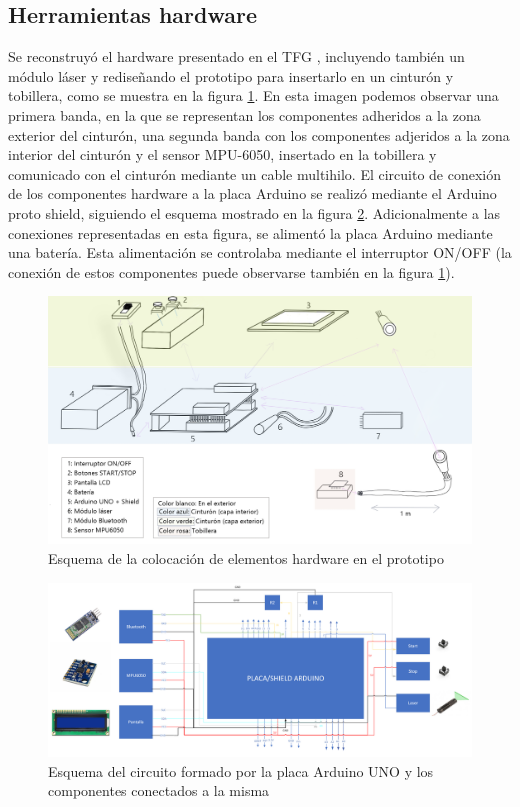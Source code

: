 \subsection{Herramientas hardware}
Se reconstruyó el hardware presentado en el TFG \cite{Martos2024}, incluyendo también un módulo láser y rediseñando el prototipo para insertarlo en un cinturón y tobillera, como se muestra en la figura \ref{fig:esquemahardware}. En esta imagen podemos observar una primera banda, en la que se representan los componentes adheridos a la zona exterior del cinturón, una segunda banda con los componentes adjeridos a la zona interior del cinturón y el sensor MPU-6050, insertado en la tobillera y comunicado con el cinturón mediante un cable multihilo. 
El circuito de conexión de los componentes hardware a la placa Arduino se realizó mediante el Arduino proto shield, siguiendo el esquema mostrado en la figura \ref{fig:esquemacircuito}. Adicionalmente a las conexiones representadas en esta figura, se alimentó la placa Arduino mediante una batería. Esta alimentación se controlaba mediante el interruptor ON/OFF (la conexión de estos componentes puede observarse también en la figura \ref{fig:esquemahardware}).
\begin{figure}[h]
    \centering
    \includegraphics[width=1\textwidth]{img/esquemahardware.png}
    \caption{Esquema de la colocación de elementos hardware en el prototipo}
    \label{fig:esquemahardware}
\end{figure}
\begin{figure}
    \centering
    \includegraphics[width=1\textwidth]{img/circuito.png}
    \caption{Esquema del circuito formado por la placa Arduino UNO y los componentes conectados a la misma}
    \label{fig:esquemacircuito}
\end{figure}
